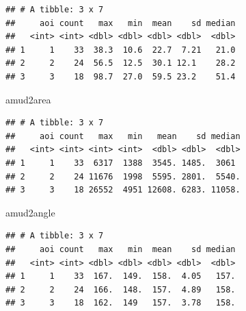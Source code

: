 \documentclass[
]{article}
\newenvironment{Shaded}{\begin{snugshade}}{\end{snugshade}}
\newcommand{\NormalTok}[1]{#1}
\begin{document}
\begin{verbatim}
## # A tibble: 3 x 7
##     aoi count   max   min  mean    sd median
##   <int> <int> <dbl> <dbl> <dbl> <dbl>  <dbl>
## 1     1    33  38.3  10.6  22.7  7.21   21.0
## 2     2    24  56.5  12.5  30.1 12.1    28.2
## 3     3    18  98.7  27.0  59.5 23.2    51.4
\end{verbatim}

\begin{Shaded}
\begin{Highlighting}[]
\NormalTok{amud2area}
\end{Highlighting}
\end{Shaded}

\begin{verbatim}
## # A tibble: 3 x 7
##     aoi count   max   min   mean    sd median
##   <int> <int> <int> <int>  <dbl> <dbl>  <dbl>
## 1     1    33  6317  1388  3545. 1485.  3061 
## 2     2    24 11676  1998  5595. 2801.  5540.
## 3     3    18 26552  4951 12608. 6283. 11058.
\end{verbatim}

\begin{Shaded}
\begin{Highlighting}[]
\NormalTok{amud2angle}
\end{Highlighting}
\end{Shaded}

\begin{verbatim}
## # A tibble: 3 x 7
##     aoi count   max   min  mean    sd median
##   <int> <int> <dbl> <dbl> <dbl> <dbl>  <dbl>
## 1     1    33  167.  149.  158.  4.05   157.
## 2     2    24  166.  148.  157.  4.89   158.
## 3     3    18  162.  149   157.  3.78   158.
\end{verbatim}
\end{document}
